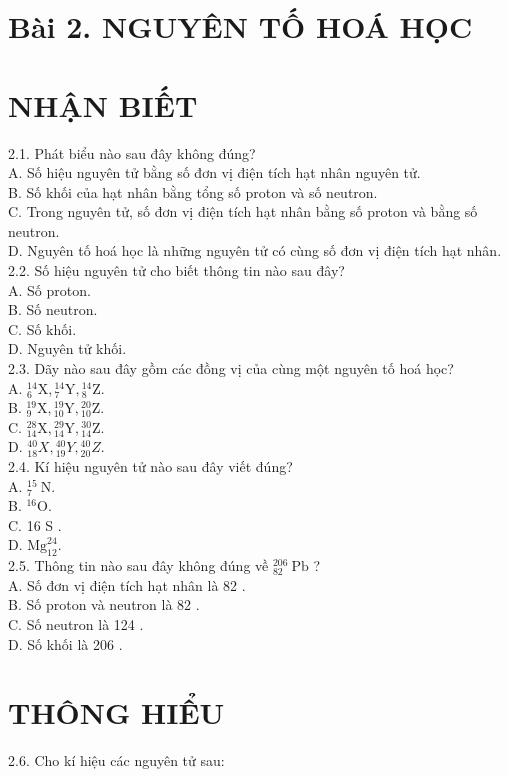 \documentclass[10pt]{article}
\begin{document}
\section*{Bài 2. NGUYÊN TỐ HOÁ HỌC}
\section*{NHẬN BIẾT}
2.1. Phát biểu nào sau đây không đúng?\\
A. Số hiệu nguyên tử bằng số đơn vị điện tích hạt nhân nguyên tử.\\
B. Số khối của hạt nhân bằng tổng số proton và số neutron.\\
C. Trong nguyên tử, số đơn vị điện tích hạt nhân bằng số proton và bằng số neutron.\\
D. Nguyên tố hoá học là những nguyên tử có cùng số đơn vị điện tích hạt nhân.\\
2.2. Số hiệu nguyên tử cho biết thông tin nào sau đây?\\
A. Số proton.\\
B. Số neutron.\\
C. Số khối.\\
D. Nguyên tử khối.\\
2.3. Dãy nào sau đây gồm các đồng vị của cùng một nguyên tố hoá học?\\
A. ${ }_{6}^{14} \mathrm{X},{ }_{7}^{14} \mathrm{Y},{ }_{8}^{14} \mathrm{Z}$.\\
B. ${ }_{9}^{19} \mathrm{X},{ }_{10}^{19} \mathrm{Y},{ }_{10}^{20} \mathrm{Z}$.\\
C. ${ }_{14}^{28} \mathrm{X},{ }_{14}^{29} \mathrm{Y},{ }_{14}^{30} \mathrm{Z}$.\\
D. ${ }_{18}^{40} X,{ }_{19}^{40} Y,{ }_{20}^{40} Z$.\\
2.4. Kí hiệu nguyên tử nào sau đây viết đúng?\\
A. ${ }_{7}^{15} \mathrm{~N}$.\\
B. ${ }^{16} \mathrm{O}$.\\
C. 16 S .\\
D. $\mathrm{Mg}_{12}^{24}$.\\
2.5. Thông tin nào sau đây không đúng về ${ }_{82}^{206} \mathrm{~Pb}$ ?\\
A. Số đơn vị điện tích hạt nhân là 82 .\\
B. Số proton và neutron là 82 .\\
C. Số neutron là 124 .\\
D. Số khối là 206 .

\section*{THÔNG HIỂU}
2.6. Cho kí hiệu các nguyên tử sau:
\end{document}
